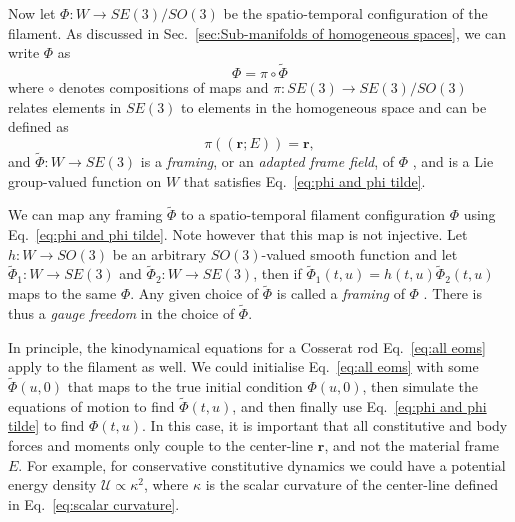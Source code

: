 Now let $\Phi : W \to SE(3)/SO(3)$ be the spatio-temporal configuration of the filament. As discussed in Sec.~\ref{sec:Sub-manifolds of homogeneous spaces}, we can write $\Phi$ as
\begin{equation} \label{eq:phi and phi tilde}
\Phi = \pi \circ \tilde{\Phi}
\end{equation}
where $\circ$ denotes compositions of maps and $\pi : SE(3) \to SE(3)/SO(3)$ relates elements in $SE(3)$ to elements in the homogeneous space and can be defined as
\begin{equation}
\pi( (\mathbf{r} ; E) ) = \mathbf{r},
\end{equation}
and $\tilde{\Phi} : W \to SE(3)$ is a \textit{framing}, or an \textit{adapted frame field}, of $\Phi$ \citep{clellandFrenetCartanMethod2017}, and is a Lie group-valued function on $W$ that satisfies Eq.~\ref{eq:phi and phi tilde}.

We can map any framing $\tilde{\Phi}$ to a spatio-temporal filament configuration $\Phi$ using Eq.~\ref{eq:phi and phi tilde}. Note however that this map is not injective. Let $h : W \to SO(3)$ be an arbitrary $SO(3)$-valued smooth function and let $\tilde{\Phi}_1 : W \to SE(3)$ and $\tilde{\Phi}_2 : W \to SE(3)$, then if $\tilde{\Phi}_1(t,u) = h(t,u) \tilde{\Phi}_2(t,u)$ maps to the same $\Phi$. Any given choice of $\tilde{\Phi}$ is called a \textit{framing} of $\Phi$ \citep{clellandFrenetCartanMethod2017}. There is thus a \textit{gauge freedom} in the choice of $\tilde{\Phi}$.

In principle, the kinodynamical equations for a Cosserat rod Eq.~\ref{eq:all eoms} apply to the filament as well. We could initialise Eq.~\ref{eq:all eoms} with some $\tilde{\Phi}(u, 0)$ that maps to the true initial condition $\Phi(u, 0)$, then simulate the equations of motion to find $\tilde{\Phi}(t,u)$, and then finally use Eq.~\ref{eq:phi and phi tilde} to find $\Phi(t, u)$. In this case, it is important that all constitutive and body forces and moments only couple to the center-line $\mathbf{r}$, and not the material frame $E$. For example, for conservative constitutive dynamics we could have a potential energy density $\mathcal{U} \propto \kappa^2$, where $\kappa$ is the scalar curvature of the center-line defined in Eq.~\ref{eq:scalar curvature}.

